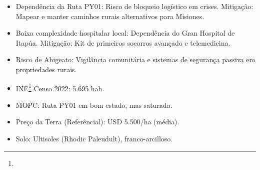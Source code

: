 \begin{itemize}
\item
  Dependência da Ruta PY01: Risco de bloqueio logístico em crises.
  Mitigação: Mapear e manter caminhos rurais alternativos para Misiones.
\item
  Baixa complexidade hospitalar local: Dependência do Gran Hospital de
  Itapúa. Mitigação: Kit de primeiros socorros avançado e telemedicina.
\item
  Risco de Abigeato: Vigilância comunitária e sistemas de segurança
  passiva em propriedades rurais.
\item
  INE\footnote{\fineINE} Censo 2022: 5.695 hab.
\item
  MOPC: Ruta PY01 em bom estado, mas saturada.
\item
  Preço da Terra (Referêncial): USD 5.500/\allowbreak ha (média).
\item
  Solo: Ultisoles (Rhodic Paleudult), franco-arcilloso.
\end{itemize}
